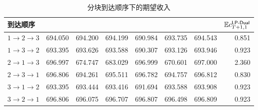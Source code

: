 \begin{table}[htbp]
\centering\small
\caption{分块到达顺序下的期望收入}\label{tab:order}
\begin{tabular}{lrrrrrrr}
\toprule
到达顺序 & \Greedy{} & \LPFD{} & \LPDual{} & \LPCount{} & \IIDDP{} & \SeqDP{} & $\mathbb E c^{\textsf{LP-Dual}}_{T+1,1}$ \\
\midrule
$1\to2\to3$ & 694.050 & 694.200 & 694.199 & 690.984 & 693.735 & 694.543 & 0.851 \\
$1\to3\to2$ & 693.395 & 693.626 & 693.588 & 690.307 & 693.126 & 693.946 & 0.923 \\
$2\to1\to3$ & 696.997 & 674.747 & 683.029 & 696.999 & 670.601 & 697.000 & 2.360 \\
$2\to3\to1$ & 696.806 & 694.261 & 695.511 & 696.782 & 694.757 & 696.812 & 0.830 \\
$3\to1\to2$ & 693.395 & 693.444 & 693.416 & 691.694 & 693.588 & 693.908 & 0.923 \\
$3\to2\to1$ & 696.806 & 696.075 & 696.707 & 696.807 & 696.498 & 696.809 & 0.923 \\
\bottomrule
\end{tabular}
\par{}
\end{table}

